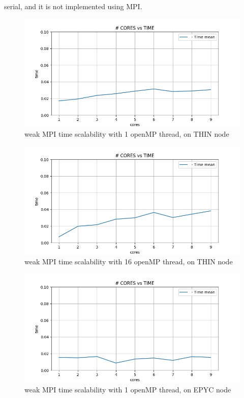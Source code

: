 \documentclass[12pt, titlepage]{report}
\begin{document}
serial, and it is not implemented using MPI.
\begin{figure}[H]
	\centering
	\includegraphics[width=\textwidth]{Assignment-1/MPI_W-scalability_static-ev_1omp-threds-THIN_time.png}
	\caption{weak MPI time scalability with 1 openMP thread, on THIN node}
\end{figure}
\begin{figure}[H]
	\centering
	\includegraphics[width=\textwidth]{Assignment-1/MPI_W-scalability_static-ev_16omp-threds-THIN_time.png}
	\caption{weak MPI time scalability with 16 openMP thread, on THIN node}
\end{figure}
\begin{figure}[H]
	\centering
	\includegraphics[width=\textwidth]{Assignment-1/MPI_W-scalability_static-ev_1omp-threds_time.png}
	\caption{weak MPI time scalability with 1 openMP thread, on EPYC node}
\end{figure}
\end{document}
